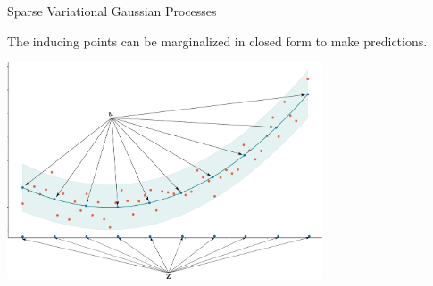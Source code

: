 \documentclass[aspectratio=149]{beamer}
\begin{document}
    \begin{frame}{Sparse Variational Gaussian Processes}
    \begin{center}
    The inducing points can be marginalized in closed form to make predictions.
    \end{center}
    
    \begin{center}
        \includegraphics[width=0.7\textwidth]{slides_imgs/GP_inducing_3.pdf}
    \end{center}
    \end{frame}


\end{document}
